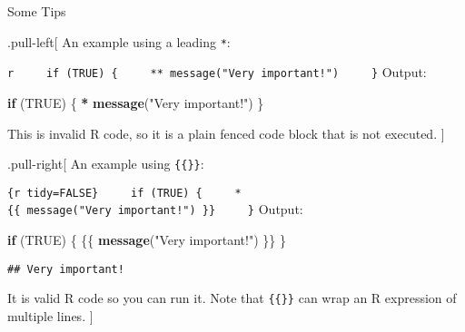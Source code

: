 \documentclass[ignorenonframetext,]{beamer}
\newenvironment{Shaded}{\begin{snugshade}}{\end{snugshade}}
\newcommand{\ControlFlowTok}[1]{\textcolor[rgb]{0.13,0.29,0.53}{\textbf{#1}}}
\newcommand{\KeywordTok}[1]{\textcolor[rgb]{0.13,0.29,0.53}{\textbf{#1}}}
\newcommand{\NormalTok}[1]{#1}
\newcommand{\OperatorTok}[1]{\textcolor[rgb]{0.81,0.36,0.00}{\textbf{#1}}}
\newcommand{\OtherTok}[1]{\textcolor[rgb]{0.56,0.35,0.01}{#1}}
\newcommand{\StringTok}[1]{\textcolor[rgb]{0.31,0.60,0.02}{#1}}
\begin{document}
\begin{frame}[fragile]{Some Tips}
\protect\hypertarget{some-tips-4}{}

.pull-left{[} An example using a leading \texttt{*}:

\texttt{r\ \ \ \ \ if\ (TRUE)\ \{\ \ \ \ \ **\ message("Very\ important!")\ \ \ \ \ \}}
Output:

\begin{Shaded}
\begin{Highlighting}[]
\ControlFlowTok{if}\NormalTok{ (}\OtherTok{TRUE}\NormalTok{) \{}
\OperatorTok{*}\StringTok{ }\KeywordTok{message}\NormalTok{(}\StringTok{"Very important!"}\NormalTok{)}
\NormalTok{\}}
\end{Highlighting}
\end{Shaded}

This is invalid R code, so it is a plain fenced code block that is not
executed. {]}

.pull-right{[} An example using \texttt{\{\{\}\}}:

\texttt{\{r\ tidy=FALSE\}\ \ \ \ \ if\ (TRUE)\ \{\ \ \ \ \ *\{\{\ message("Very\ important!")\ \}\}\ \ \ \ \ \}}
Output:

\begin{Shaded}
\begin{Highlighting}[]
\ControlFlowTok{if}\NormalTok{ (}\OtherTok{TRUE}\NormalTok{) \{}
\NormalTok{\{\{ }\KeywordTok{message}\NormalTok{(}\StringTok{"Very important!"}\NormalTok{) \}\}}
\NormalTok{\}}
\end{Highlighting}
\end{Shaded}

\begin{verbatim}
## Very important!
\end{verbatim}

It is valid R code so you can run it. Note that \texttt{\{\{\}\}} can
wrap an R expression of multiple lines. {]}

\end{frame}
\end{document}

